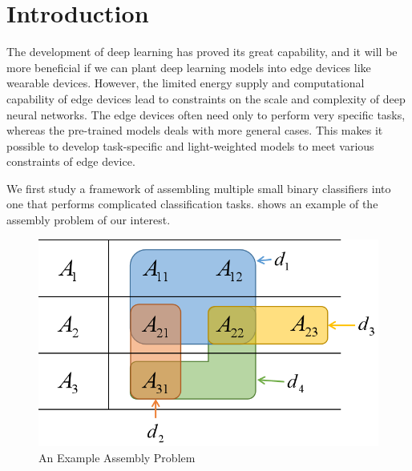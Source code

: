\documentclass[sigplan,10pt,review]{acmart}\settopmatter{printfolios=true,printccs=false,printacmref=false}
\begin{document}
\section{Introduction}
\label{sec:intro}
The development of deep learning has proved its great capability, and it will be more beneficial if we can plant deep learning models into edge devices like wearable devices.
However, the limited energy supply and computational capability of edge devices lead to constraints on the scale and complexity of deep neural networks.
The edge devices often need only to perform very specific tasks, whereas the pre-trained models deals with more general cases.
This makes it possible to develop task-specific and light-weighted models to meet various constraints of edge device.


We first study a framework of assembling multiple small binary classifiers into one that performs complicated classification tasks.
 shows an example of the assembly problem of our interest.

\begin{figure}[h]
    \centering
    \includegraphics[width=0.75\linewidth]{fig/formulation_example.png}
    \caption{An Example Assembly Problem}
    \label{fig:assemble-example-venn}
\end{figure}
\end{document}
